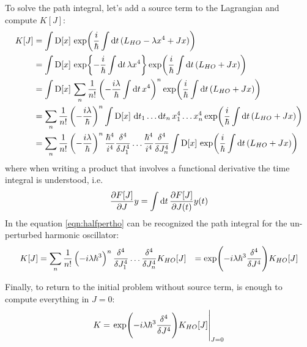 \documentclass[main.tex]{subfiles}
\begin{document}
To solve the path integral, let's add a source term to the Lagrangian and compute $K[J]$:
\begin{align}
K[J] &= \int \DD{x} \exp( \frac{i}{\hbar} \int \dd{t} (L_{HO} - \lambda x^4 + Jx ) ) \\
&= \int \DD{x} \exp{ -\frac{i}{\hbar} \int \dd{t} \lambda x^4} \exp( \frac{i}{\hbar} \int \dd{t} (L_{HO} + Jx ) ) \\
&= \int \DD{x} \sum_n \frac{1}{n!} \left( -\frac{i\lambda}{\hbar} \int \dd{t} x^4 \right)^n \exp( \frac{i}{\hbar} \int \dd{t} (L_{HO} + Jx ) ) \\
&= \sum_n \frac{1}{n!} \left( -\frac{i\lambda}{\hbar} \right)^n \int \DD{x} \dd{t_1} \dots \dd{t_n} x_1^4 \dots x_n^4 \exp( \frac{i}{\hbar} \int \dd{t} (L_{HO} + Jx ) ) \\
&= \sum_n \frac{1}{n!} \left( -\frac{i\lambda}{\hbar} \right)^n \frac{\hbar^4}{i^4}\fdv[4]{J_1}\dots\frac{\hbar^4}{i^4}\fdv[4]{J_n} \int \DD{x} \exp( \frac{i}{\hbar} \int \dd{t} (L_{HO} + Jx ) ) \label{eqn:halfpertho}
\end{align}
where when writing a product that involves a functional derivative the time integral is understood, i.e.
\begin{equation}
\pdv{F[J]}{J} y = \int \dd{t} \pdv{F[J]}{J(t)} y(t)
\end{equation}
In the equation \eqref{eqn:halfpertho} can be recognized the path integral for the un-perturbed harmonic oscillator:
\begin{align}
K[J] &= \sum_n \frac{1}{n!} \left( -i\lambda\hbar^3 \right)^n \fdv[4]{J_1}\dots\fdv[4]{J_n} K_{HO}[J]
&= \exp( -i\lambda\hbar^3 \fdv[4]{J} ) K_{HO}[J]
\end{align}

Finally, to return to the initial problem without source term, is enough to compute everything in $J=0$:
\begin{equation}
K = \eval{ \exp( -i\lambda\hbar^3 \fdv[4]{J} ) K_{HO}[J] }_{J=0}
\end{equation}







\end{document}
